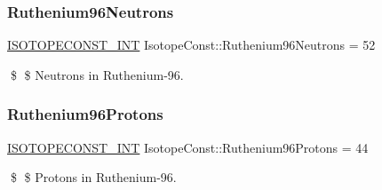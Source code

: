 \subsubsection{\texorpdfstring{Ruthenium96\+Neutrons}{Ruthenium96Neutrons}}
{\footnotesize\ttfamily \mbox{\hyperlink{group___isotope_const-_macros_ga5f18360b3e99483a35c32d789e62621c}{I\+S\+O\+T\+O\+P\+E\+C\+O\+N\+S\+T\+\_\+\+I\+NT}} Isotope\+Const\+::\+Ruthenium96\+Neutrons = 52}

\$ \$ Neutrons in Ruthenium-\/96. \mbox{\label{group___isotope_const-_ruthenium-_ru96_ga3334ea3437167e1575d12156c5dc5518}} 
\subsubsection{\texorpdfstring{Ruthenium96\+Protons}{Ruthenium96Protons}}
{\footnotesize\ttfamily \mbox{\hyperlink{group___isotope_const-_macros_ga5f18360b3e99483a35c32d789e62621c}{I\+S\+O\+T\+O\+P\+E\+C\+O\+N\+S\+T\+\_\+\+I\+NT}} Isotope\+Const\+::\+Ruthenium96\+Protons = 44}

\$ \$ Protons in Ruthenium-\/96. 